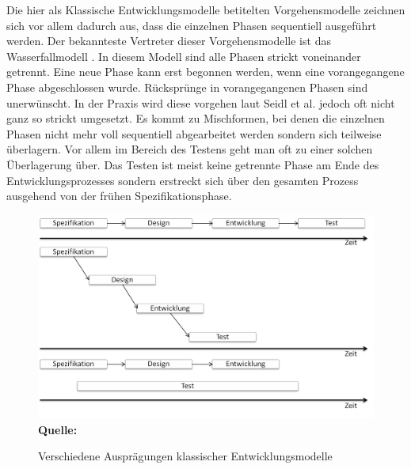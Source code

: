 Die hier als Klassische Entwicklungsmodelle betitelten Vorgehensmodelle zeichnen sich vor allem dadurch aus, dass die einzelnen Phasen sequentiell ausgeführt werden. Der bekannteste Vertreter dieser Vorgehensmodelle ist das Wasserfallmodell \cite{royce_managing_1987}. In diesem Modell sind alle Phasen strickt voneinander getrennt. Eine neue Phase kann erst begonnen werden, wenn eine vorangegangene Phase abgeschlossen wurde. Rücksprünge in vorangegangenen Phasen sind unerwünscht. In der Praxis wird diese vorgehen laut Seidl et al. \cite[vgl. S.22]{seidl_basiswissen_2012} jedoch oft nicht ganz so strickt umgesetzt. Es kommt zu Mischformen, bei denen die einzelnen Phasen nicht mehr voll sequentiell abgearbeitet werden sondern sich teilweise überlagern. Vor allem im Bereich des Testens geht man oft zu einer solchen Überlagerung über. Das Testen ist meist keine getrennte Phase am Ende des Entwicklungsprozesses sondern erstreckt sich über den gesamten Prozess ausgehend von der frühen Spezifikationsphase.

\begin{figure}[htb]
  \centering  
  \includegraphics[scale=0.7]{img/sequentielleentwicklungsmodelle.png}\\
  \footnotesize\sffamily\textbf{Quelle:} \cite[vgl. S.22]{seidl_basiswissen_2012}
  \caption{Verschiedene Ausprägungen klassischer Entwicklungsmodelle}
  \label{fig:verschiedene_auspraegungen_klassischer_entwicklungsmodelle}
\end{figure}

